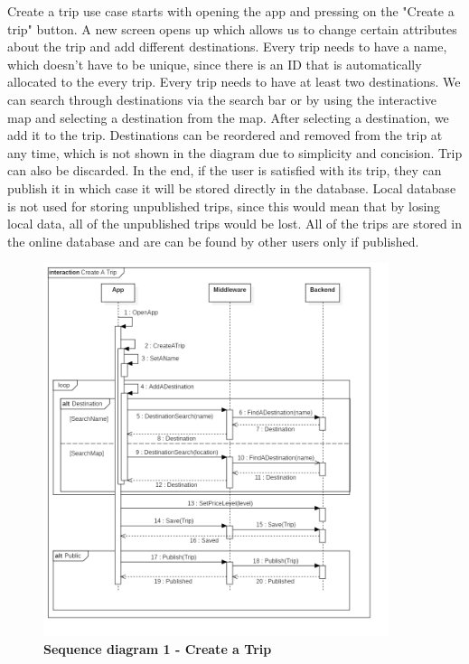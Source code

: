 \hspace{\parindent}Create a trip use case starts with opening the app and pressing on the "Create a trip" button. A new screen opens up which allows us to change certain attributes about the trip and add different destinations. Every trip needs to have a name, which doesn't have to be unique, since there is an ID that is automatically allocated to the every trip. Every trip needs to have at least two destinations. We can search through destinations via the search bar or by using the interactive map and selecting a destination from the map. After selecting a destination, we add it to the trip. Destinations can be reordered and removed from the trip at any time, which is not shown in the diagram due to simplicity and concision. Trip can also be discarded. In the end, if the user is satisfied with its trip, they can publish it in which case it will be stored directly in the database. Local database is not used for storing unpublished trips, since this would mean that by losing local data, all of the unpublished trips would be lost. All of the trips are stored in the online database and are can be found by other users only if published.  
\begin{figure}[!htb]
\centering
\includegraphics[width=0.9\textwidth]{../Graphs/Sequence1_Create_A_Trip.png}
\caption{\label{fig:dbapiuser}\textbf{Sequence diagram 1 - Create a Trip}}
\end{figure}
\newpage
